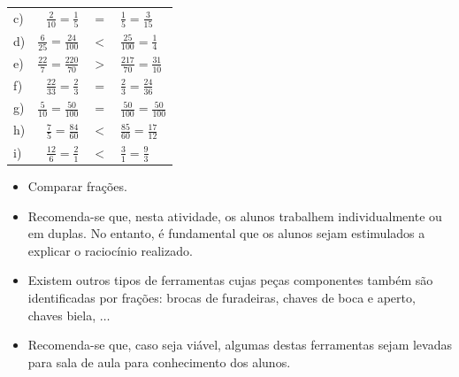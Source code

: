 \begin{multicols}{2}
\begin{solucao}{}{}
\begin{tabular}{lrcl}
       c) &  $\frac{2}{10} = \frac{1}{5}$ &   $=$  &  $\frac{1}{5} =
\frac{3}{15}$ \\

       d) &  $\frac{6}{25} = \frac{24}{100}$ &   $<$  &  $\frac{25}{100} =
\frac{1}{4}$ \\

       e) &  $\frac{22}{7} = \frac{220}{70}$ &   $>$  &  $\frac{217}{70} =
\frac{31}{10}$ \\

       f) &  $\frac{22}{33} = \frac{2}{3}$ &   $=$  &  $\frac{2}{3} =
\frac{24}{36}$ \\

       g) &  $\frac{5}{10} = \frac{50}{100}$ &   $=$  &  $\frac{50}{100} =
\frac{50}{100}$ \\

       h) &  $\frac{7}{5} = \frac{84}{60}$ &   $<$  &  $\frac{85}{60} =
\frac{17}{12}$ \\

       i) &  $\frac{12}{6} = \frac{2}{1}$ &   $<$  &  $\frac{3}{1} =
\frac{9}{3}$ \\

    \end{tabular}
\end{solucao}

 \clearpage


\begin{objetivos}[label=chap4-ativ14]{}{}
\begin{itemize} %
    \item       Comparar frações.
\end{itemize} %
\end{objetivos}

\begin{orientacoes}{}{}

\begin{itemize} %
    \item       Recomenda-se que, nesta atividade, os alunos trabalhem
individualmente ou em duplas. No entanto, é fundamental que os alunos sejam
estimulados a explicar o raciocínio realizado.
    \item       Existem outros tipos de ferramentas cujas peças componentes
também são identificadas por frações: brocas de furadeiras, chaves de boca e
aperto, chaves biela,       $\ldots$
    \item       Recomenda-se que, caso seja viável, algumas destas ferramentas
sejam levadas para sala de aula para conhecimento dos alunos.
\end{itemize} %



\end{orientacoes}
\end{multicols}

